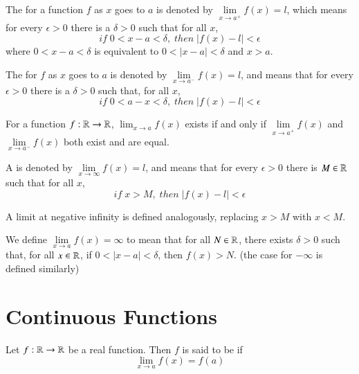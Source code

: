 \documentclass[12pt, a4paper, oneside, openright, titlepage]{book}
\begin{document}
\begin{defn}
    The  for a function $f$ as $x$ goes to $a$ is denoted by $\lim\limits_{x\rightarrow a^+}f(x) = l$, which means for every $\epsilon > 0$ there is a $\delta > 0$ such that for all $x$, $$if\;0 < x-a < \delta,\;then\;|f(x) - l|< \epsilon$$
    where $0 < x-a < \delta$ is equivalent to $0 < |x-a| < \delta$ and $x > a$.

    The  for $f$ as $x$ goes to $a$ is denoted by $\lim\limits_{x\rightarrow a^-}f(x) = l$, and means that for every $\epsilon > 0$ there is a $\delta > 0$ such that, for all $x$, $$if\;0 < a-x < \delta,\;then\;|f(x) - l| < \epsilon$$
\end{defn}


\begin{rmk}
    For a function $f:\mathbb R\rightarrow \mathbb R$, $\lim_{x\rightarrow a}f(x)$ exists if and only if $\lim\limits_{x\rightarrow a^+}f(x)$ and $\lim\limits_{x\rightarrow a^-}f(x)$ both exist and are equal.
\end{rmk}


\begin{defn}
    A  is denoted by $\lim\limits_{x\rightarrow \infty}f(x) = l$, and means that for every $\epsilon > 0$ there is $M \in \mathbb R$ such that for all $x$, $$if\;x>M,\;then\;|f(x) - l| < \epsilon$$

    A limit at negative infinity is defined analogously, replacing $x> M$ with $x < M$.
\end{defn}


\begin{defn}
    We define $\lim\limits_{x\rightarrow a}f(x) = \infty$ to mean that for all $N \in \mathbb R$, there exists $\delta > 0$ such that, for all $x \in \mathbb R$, if $0 < |x-a| < \delta$, then $f(x) > N$. (the case for $-\infty$ is defined similarly)
\end{defn}



\section{Continuous Functions}


\begin{defn}[Continuity]
    Let $f:\mathbb R\rightarrow \mathbb R$ be a real function. Then $f$ is said to be  if \begin{equation}
        \lim\limits_{x\rightarrow a}f(x) = f(a)
    \end{equation}
\end{defn}
\end{document}

